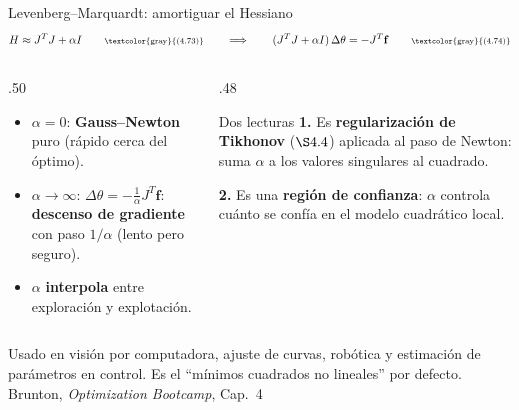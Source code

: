 \documentclass[10pt,aspectratio=169]{beamer}
\newcommand{\fuente}{\vfill{\scriptsize\color{gray}Brunton, \emph{Optimization Bootcamp}, Cap.~4}}
\begin{document}
\begin{frame}{Levenberg--Marquardt: amortiguar el Hessiano}
  \small
  \[
    H \approx J^TJ + \alpha I \qquad\text{\scriptsize\textcolor{gray}{(4.73)}}
    \qquad\Longrightarrow\qquad
    (J^TJ + \alpha I)\,\Delta\theta = -J^T\mathbf{f} \qquad\text{\scriptsize\textcolor{gray}{(4.74)}}
  \]

  \begin{columns}[T,onlytextwidth]
    \begin{column}{.50\textwidth}
      \begin{itemize}
        \item $\alpha = 0$: \textbf{Gauss--Newton} puro (rápido cerca del
          óptimo).
        \item $\alpha \to \infty$: $\Delta\theta = -\frac{1}{\alpha}J^T\mathbf{f}$:
          \textbf{descenso de gradiente} con paso $1/\alpha$ (lento pero
          seguro).
        \item $\alpha$ \textbf{interpola} entre exploración y explotación.
      \end{itemize}
    \end{column}
    \begin{column}{.48\textwidth}
      \begin{block}{Dos lecturas}
        \scriptsize
        \textbf{1.} Es \textbf{regularización de Tikhonov} ($\S4{.}4$) aplicada
        al paso de Newton: suma $\alpha$ a los valores singulares al cuadrado.

        \vspace{2mm}
        \textbf{2.} Es una \textbf{región de confianza}: $\alpha$ controla
        cuánto se confía en el modelo cuadrático local.
      \end{block}
    \end{column}
  \end{columns}

  \vspace{1mm}
  \footnotesize
  Usado en visión por computadora, ajuste de curvas, robótica y estimación de
  parámetros en control. Es el ``mínimos cuadrados no lineales'' por defecto.
  \fuente
\end{frame}
\end{document}
